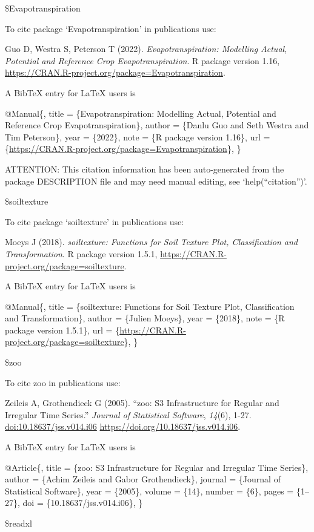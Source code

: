\documentclass[
]{article}
\begin{document}
\$Evapotranspiration

To cite package `Evapotranspiration' in publications use:

Guo D, Westra S, Peterson T (2022). \emph{Evapotranspiration: Modelling
Actual, Potential and Reference Crop Evapotranspiration}. R package
version 1.16,
\url{https://CRAN.R-project.org/package=Evapotranspiration}.

A BibTeX entry for LaTeX users is

@Manual\{, title = \{Evapotranspiration: Modelling Actual, Potential and
Reference Crop Evapotranspiration\}, author = \{Danlu Guo and Seth
Westra and Tim Peterson\}, year = \{2022\}, note = \{R package version
1.16\}, url =
\{\url{https://CRAN.R-project.org/package=Evapotranspiration}\}, \}

ATTENTION: This citation information has been auto-generated from the
package DESCRIPTION file and may need manual editing, see
`help(``citation'')'.

\$soiltexture

To cite package `soiltexture' in publications use:

Moeys J (2018). \emph{soiltexture: Functions for Soil Texture Plot,
Classification and Transformation}. R package version 1.5.1,
\url{https://CRAN.R-project.org/package=soiltexture}.

A BibTeX entry for LaTeX users is

@Manual\{, title = \{soiltexture: Functions for Soil Texture Plot,
Classification and Transformation\}, author = \{Julien Moeys\}, year =
\{2018\}, note = \{R package version 1.5.1\}, url =
\{\url{https://CRAN.R-project.org/package=soiltexture}\}, \}

\$zoo

To cite zoo in publications use:

Zeileis A, Grothendieck G (2005). ``zoo: S3 Infrastructure for Regular
and Irregular Time Series.'' \emph{Journal of Statistical Software},
\emph{14}(6), 1-27. \url{doi:10.18637/jss.v014.i06}
\url{https://doi.org/10.18637/jss.v014.i06}.

A BibTeX entry for LaTeX users is

@Article\{, title = \{zoo: S3 Infrastructure for Regular and Irregular
Time Series\}, author = \{Achim Zeileis and Gabor Grothendieck\},
journal = \{Journal of Statistical Software\}, year = \{2005\}, volume =
\{14\}, number = \{6\}, pages = \{1--27\}, doi =
\{10.18637/jss.v014.i06\}, \}

\$readxl
\end{document}
